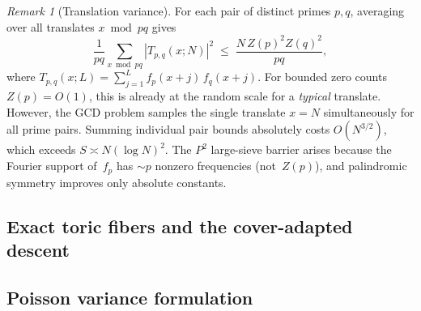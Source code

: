 \documentclass[11pt]{article}
\theoremstyle{definition}
\theoremstyle{remark}
\newtheorem{remark}[theorem]{Remark}
\begin{document}
\begin{remark}[Translation variance]
\label{rem:translate}
For each pair of distinct primes $p, q$,
averaging over all translates $x \bmod pq$
gives
\[
  \frac{1}{pq} \sum_{x \bmod pq}
  |T_{p,q}(x; N)|^2
  \;\le\;
  \frac{N\,Z(p)^2 Z(q)^2}{pq},
\]
where $T_{p,q}(x; L) = \sum_{j=1}^L f_p(x+j)\,f_q(x+j)$.
For bounded zero counts $Z(p) = O(1)$,
this is already at the random scale for a
\emph{typical} translate.
However, the GCD problem samples the single
translate $x = N$ simultaneously for all prime
pairs.
Summing individual pair bounds absolutely
costs $O(N^{3/2})$, which exceeds $S \asymp N(\log N)^2$.
The $P^2$ large-sieve barrier arises because
the Fourier support of~$f_p$ has $\sim p$
nonzero frequencies (not~$Z(p)$), and
palindromic symmetry improves only absolute constants.
\end{remark}







\subsection{Exact toric fibers and the cover-adapted descent}
\label{ssec:exact-toric-cover-descent}















\subsection{Poisson variance formulation}\label{ssec:poisson}
\end{document}
